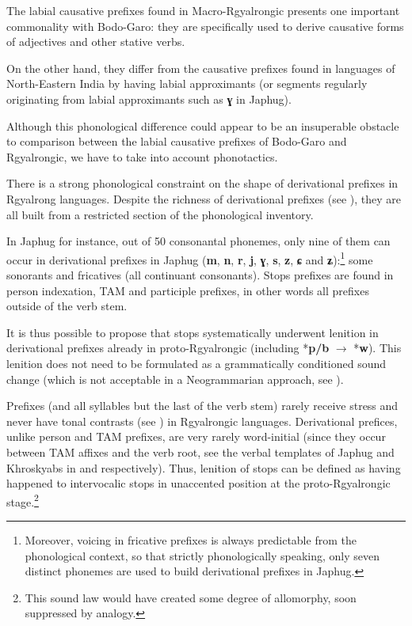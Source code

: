\documentclass[oneside,a4paper,11pt]{article}
\newcommand{\ipa}[1]{\textbf{{\phon\mbox{#1}}}} %
\begin{document}
The labial causative prefixes found in Macro-Rgyalrongic presents one important commonality with Bodo-Garo: they are specifically used to derive causative forms of adjectives and other stative verbs.

On the other hand, they differ from the causative prefixes found in languages of North-Eastern India by having labial approximants (or segments regularly originating from labial approximants such as \ipa{ɣ} in Japhug). 

Although this phonological difference could appear to be an insuperable obstacle to comparison between the labial causative prefixes of Bodo-Garo and Rgyalrongic, we have to take into account phonotactics. 

There is a strong phonological constraint on the shape of derivational prefixes in Rgyalrong languages. Despite the richness of derivational prefixes (see \citealt{jackson14morpho, jacques14antipassive}), they are all built from a restricted section of the phonological inventory.

In Japhug for instance, out of 50 consonantal phonemes, only nine of them can occur in derivational prefixes in Japhug (\ipa{m}, \ipa{n}, \ipa{r}, \ipa{j}, \ipa{ɣ}, \ipa{s}, \ipa{z}, \ipa{ɕ} and \ipa{ʑ}):\footnote{Moreover, voicing in fricative prefixes is always predictable from the phonological context, so that strictly phonologically speaking, only seven distinct phonemes are used to build derivational prefixes in Japhug.} some sonorants and fricatives (all continuant consonants). Stops prefixes are found in person indexation, TAM and participle prefixes, in other words all prefixes outside of the verb stem. 

It is thus possible to propose that stops systematically underwent lenition in derivational prefixes already in proto-Rgyalrongic (including *\ipa{p/b} $\rightarrow$ *\ipa{w}). This lenition does not need to be formulated as a grammatically conditioned sound change (which is not acceptable in a Neogrammarian approach, see \citealt{hill14conditioned}). 

Prefixes (and all syllables but the last of the verb stem) rarely receive stress and never have tonal contrasts (see \citealt{jackson05yingao}) in Rgyalrongic languages. Derivational prefices, unlike person and TAM prefixes, are very rarely word-initial (since they occur between TAM affixes and the verb root, see the verbal templates of Japhug and Khroskyabs in \citealt{jacques13harmonization} and \citealt{lai15person} respectively). Thus, lenition of stops can be defined as having happened to intervocalic stops in unaccented position at the proto-Rgyalrongic stage.\footnote{This sound law would have created some degree of allomorphy, soon suppressed by analogy.}
\end{document}
